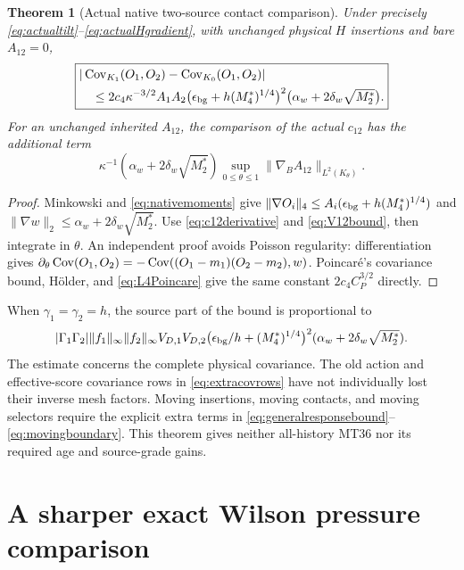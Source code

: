 \documentclass[11pt,letterpaper]{article}
\theoremstyle{plain}
\newtheorem{theorem}{Theorem}[section]
\theoremstyle{remark}\newtheorem{remark}[theorem]{Scope}
\begin{document}
\begin{theorem}[Actual native two-source contact comparison]
\label{thm:contactvariation}
Under precisely \eqref{eq:actualtilt}--\eqref{eq:actualHgradient}, with unchanged
physical $H$ insertions and bare $A_{12}=0$,
\begin{equation}
\boxed{\begin{aligned}
&|\operatorname{Cov}_{K_1}(O_1,O_2)-\operatorname{Cov}_{K_0}(O_1,O_2)|\\
&\quad\le2c_4\kappa^{-3/2}A_1A_2
\bigl(\epsilon_{\rm bg}+h(M_4^*)^{1/4}\bigr)^2
\bigl(\alpha_w+2\delta_w\sqrt{M_2^*}\bigr).
\end{aligned}}
\label{eq:contactvariation}
\end{equation}
For an unchanged inherited $A_{12}$, the comparison of the actual $c_{12}$
has the additional term
\begin{equation}
\kappa^{-1}(\alpha_w+2\delta_w\sqrt{M_2^*})
\sup_{0\le\theta\le1}\|\nabla_BA_{12}\|_{L^2(K_\theta)}.
\label{eq:inheritedcontact}
\end{equation}
\end{theorem}
\begin{proof}
Minkowski and \eqref{eq:nativemoments} give
$\|\nabla O_i\|_4\le A_i(\epsilon_{\rm bg}+h(M_4^*)^{1/4})$
and $\|\nabla w\|_2\le\alpha_w+2\delta_w\sqrt{M_2^*}$.
Use \eqref{eq:c12derivative} and \eqref{eq:V12bound}, then integrate in $\theta$.
An independent proof avoids Poisson regularity: differentiation gives
$\partial_\theta\operatorname{Cov}(O_1,O_2)
=-\operatorname{Cov}((O_1-m_1)(O_2-m_2),w)$.
Poincar\'e's covariance bound, H\"older, and \eqref{eq:L4Poincare} give the
same constant $2c_4C_P^{3/2}$ directly.
\end{proof}

When $\gamma_1=\gamma_2=h$, the source part of the bound is proportional to
\[
|\Gamma_1\Gamma_2|\|f_1\|_\infty\|f_2\|_\infty V_{D,1}V_{D,2}
\bigl(\epsilon_{\rm bg}/h+(M_4^*)^{1/4}\bigr)^2
(\alpha_w+2\delta_w\sqrt{M_2^*}).
\]
The estimate concerns the complete physical covariance. The old action and
effective-score covariance rows in \eqref{eq:extracovrows} have not individually
lost their inverse mesh factors. Moving insertions, moving contacts, and moving
selectors require the explicit extra terms in
\eqref{eq:generalresponsebound}--\eqref{eq:movingboundary}. This theorem gives
neither all-history MT36 nor its required age and source-grade gains.

\section{A sharper exact Wilson pressure comparison}
\label{sec:pressure}
\end{document}
